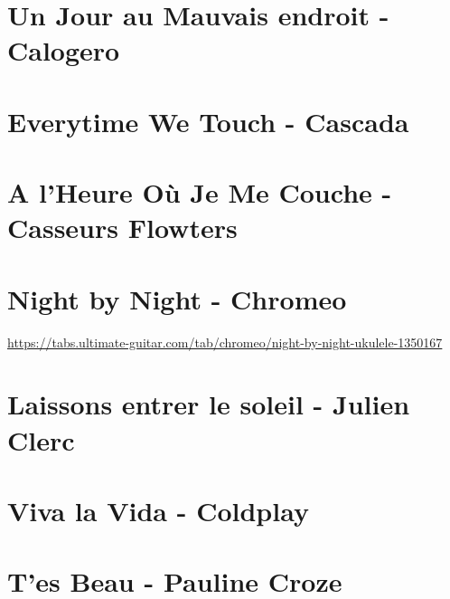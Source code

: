 \documentclass[11pt]{article}
\begin{document}
\section{Un Jour au Mauvais endroit - Calogero}
\begin{guitar}

\end{guitar}

\section{Everytime We Touch - Cascada}


\section{A l'Heure Où Je Me Couche - Casseurs Flowters}
\begin{guitar}

\end{guitar}

\section*{Night by Night - Chromeo}
\begin{guitar}
\url{https://tabs.ultimate-guitar.com/tab/chromeo/night-by-night-ukulele-1350167}
\end{guitar}

\section{Laissons entrer le soleil - Julien Clerc}


\section{Viva la Vida - Coldplay}
\begin{guitar}

\end{guitar}



\section{T'es Beau - Pauline Croze}
\begin{guitar}

\end{guitar}
\end{document}

